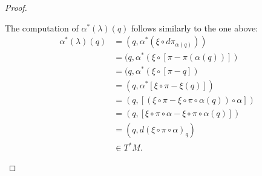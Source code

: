 \documentclass{article}
\begin{document}
\begin{proof}
\begin{enumerate}[(a)]
    The computation of $\alpha^*(\lambda)(q)$ follows similarly to the
    one above:
    \begin{align*}
      \alpha^*(\lambda)(q)
      &= (q, \alpha^*(\xi \circ d\pi_{\alpha(q)}))\\
      &= (q, \alpha^*(\xi \circ [\pi - \pi(\alpha(q))])\\
      &= (q, \alpha^*(\xi \circ [\pi - q])\\
      &= (q, \alpha^*[\xi \circ \pi - \xi(q)])\\
      &= (q, [(\xi \circ \pi - \xi \circ \pi \circ \alpha(q)) \circ \alpha])\\
      &= (q, [\xi \circ \pi \circ \alpha - \xi \circ \pi \circ \alpha(q)])\\
      &= (q, d(\xi \circ \pi \circ \alpha)_{q})\\
      &\in T^*M.
    \end{align*}
  \end{enumerate}
\end{proof}
\end{document}
